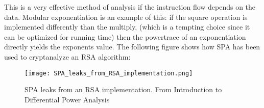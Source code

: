 This is a very effective method of analysis if the instruction flow depends on the data. 
Modular exponentiation is an example of this: if the square operation is implemented differently than the multiply, (which is a tempting choice since it can be optimized for running time) then the powertrace of an exponentiation directly yields the exponents value.
The following figure shows how SPA has been used to cryptanalyze an RSA algorithm:
\begin{figure}[htp]
  \begin{center}
    \texttt{[image: SPA\_leaks\_from\_RSA\_implementation.png]} \\
  \end{center}
  \caption[caption]{SPA leaks from an RSA implementation. \hspace{\textwidth} From Introduction to Differential Power Analysis \cite{KOCHER2011}}
\end{figure}


